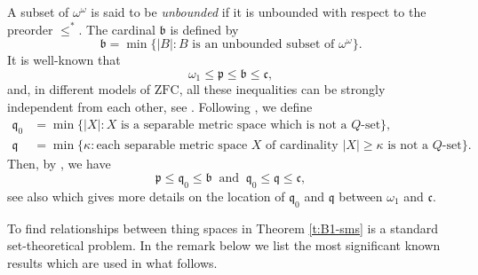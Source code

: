 \documentclass[preprint,11pt]{elsarticle}
\numberwithin{equation}{section}
\numberwithin{theorem}{section}
\newcommand{\w}{\omega}
\begin{document}
A subset of $\w^\w$ is said to be \emph{unbounded} if it is unbounded with respect to the preorder $\leq^\ast$. The cardinal $\mathfrak{b}$ is defined by
\[
\mathfrak{b} = \min\{|B|: \text{$B$ is an unbounded subset of $\w^\w$}\}.
\]
It is well-known that
\begin{equation} \label{equ:small-card-1}
\w_1 \leq \mathfrak{p} \leq \mathfrak{b} \leq \mathfrak{c},
\end{equation}
and, in different models of $\mathrm{ZFC}$, all these inequalities can be strongly independent from each other, see \cite{vD}.
Following \cite{BaMaZd}, we define
\begin{align*}
\mathfrak{q}_0 &= \min\{ |X| : X\text{ is a separable metric space which is not a $Q$-set}\},
\\
\mathfrak{q} &= \min\{ \kappa : \text{each  separable metric  space $X$ of cardinality $|X| \geq \kappa$ is not a $Q$-set}\}.
\end{align*}
Then, by \cite[Theorem~2]{BaMaZd}, we have
\begin{equation} \label{equ:small-card-2}
\mathfrak{p} \leq \mathfrak{q}_0 \leq \mathfrak{b} \ \text{ and }\ \mathfrak{q}_0 \leq \mathfrak{q} \leq \mathfrak{c},
\end{equation}
see also \cite[Theorem~4]{BaMaZd} which  gives more details on the location of  $\mathfrak{q}_0$ and $\mathfrak{q}$ between $\w_1$ and $\mathfrak{c}$.


To find relationships between thing spaces in Theorem \ref{t:B1-sms} is a standard set-theoretical problem. In the remark below we list the most significant known results which are used in what follows.
\end{document}
